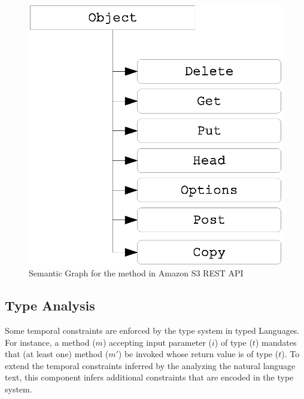 \begin{figure}
	\centering
	\includegraphics[scale=0.3]{KnowledgeGraph.eps}
	\vspace*{-2.5ex}
	\caption{Semantic Graph for the  method in Amazon S3 REST API}
	\label{fig:knowledge}
	\vspace*{-3ex}
\end{figure}

\subsection{Type Analysis}
\label{sub:typeAnalysis}

Some temporal constraints are enforced by the type system in typed Languages.
For instance, a method ($m$) accepting input parameter ($i$) of type ($t$) mandates that (at least one) method ($m'$) be invoked whose return value is of type ($t$).
To extend the temporal constraints inferred by the analyzing the natural language text, this component infers additional constraints that are encoded
in the type system. %

